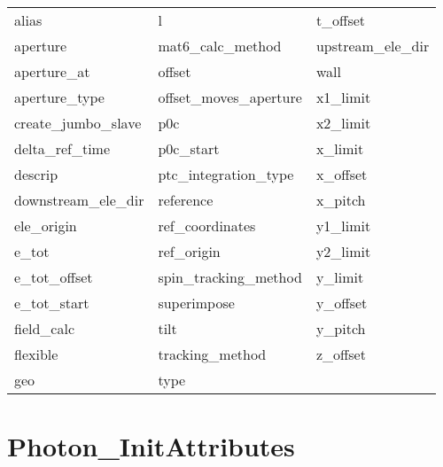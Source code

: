  \begin{tabular}{lll} \toprule
alias                       & l                           & t_offset                    \\
aperture                    & mat6_calc_method            & upstream_ele_dir            \\
aperture_at                 & offset                      & wall                        \\
aperture_type               & offset_moves_aperture       & x1_limit                    \\
create_jumbo_slave          & p0c                         & x2_limit                    \\
delta_ref_time              & p0c_start                   & x_limit                     \\
descrip                     & ptc_integration_type        & x_offset                    \\
downstream_ele_dir          & reference                   & x_pitch                     \\
ele_origin                  & ref_coordinates             & y1_limit                    \\
e_tot                       & ref_origin                  & y2_limit                    \\
e_tot_offset                & spin_tracking_method        & y_limit                     \\
e_tot_start                 & superimpose                 & y_offset                    \\
field_calc                  & tilt                        & y_pitch                     \\
flexible                    & tracking_method             & z_offset                    \\
geo                         & type                        &                             \\
 \bottomrule
 \end{tabular}
 \vfill
 
 \section{Photon_InitAttributes}
 \label{s:list.photon.init}
 
